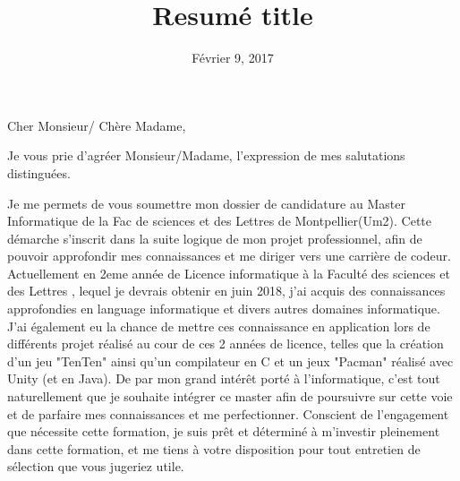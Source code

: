\documentclass[11pt,a4paper,sans]{moderncv}
\title{Resumé title}
\begin{document}
\date{Février 9, 2017}

\opening{Cher Monsieur/ Chère Madame,}
\closing{Je vous prie d'agréer Monsieur/Madame, l'expression de mes salutations distinguées.}
\makelettertitle

Je me permets de vous soumettre mon dossier de candidature au Master Informatique de la Fac de sciences et des Lettres de Montpellier(Um2).
Cette démarche s’inscrit dans la suite logique de mon projet professionnel, afin de pouvoir approfondir mes connaissances et me diriger vers une carrière de codeur.
Actuellement en 2eme année de Licence informatique à la Faculté des sciences et des Lettres , lequel je devrais obtenir en juin 2018, j’ai acquis des connaissances approfondies en language informatique et divers autres domaines informatique.
J'ai également eu la chance de mettre ces connaissance en application lors de différents projet réalisé au cour de ces 2 années de licence, telles que la création d'un jeu "TenTen" ainsi qu'un compilateur en C et un jeux "Pacman" réalisé avec Unity (et en Java).
De par mon grand intérêt porté à l'informatique, c’est tout naturellement que je souhaite intégrer ce master afin de poursuivre sur cette voie et de parfaire mes connaissances et me perfectionner.
Conscient de l’engagement que nécessite cette formation, je suis prêt et déterminé à m’investir pleinement dans cette formation, et me tiens à votre disposition pour tout  entretien de sélection que vous jugeriez utile.

\makeletterclosing
\end{document}
